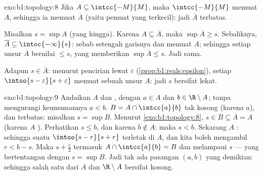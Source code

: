 \begin{solution}{exo:b1:topology:8}
Jika $A \subseteq \intcc{-M}{M}$, maka  $\intcc{-M}{M}$
memuat $A$, sehingga ia memuat $\overline A$ (yaitu pemuat 
yang terkecil): jadi $\overline A$ terbatas.

Misalkan $s = \sup A$ (yang hingga). Karena $A \subseteq \overline A$, maka $\sup
\overline A \geq s$. Sebaliknya, $\overline A \subseteq
\intoc{-\infty}{s}$: sebab setengah garisnya  dan memuat $A$; sehingga
setiap unsur $\overline A$ bernilai $\leq s$, yang memberikan $\sup\overline A
\leq s$. Jadi sama.

Adapun $s \in \overline A$: menurut pencirian lewat $\varepsilon$
(\cref{prop:b1:reals:epsilon}), setiap  $\intoo{s -
\varepsilon}{s + \varepsilon}$ memuat sebuah unsur $A$: jadi $s$
bersifat lekat.
\end{solution}

\begin{solution}{exo:b1:topology:9}
Andaikan $A$  dan , dengan $a \in A$ dan $b \in \R
\setminus A$; tanpa mengurangi keumumannya $a < b$.  $B = A \cap
\intcc{a}{b}$ tak kosong (karena $a$), dan terbatas: misalkan $s = \sup B$. Menurut
\cref{exo:b1:topology:8}, $s \in \overline B \subseteq \overline A =
A$ (karena $A$ ). Perhatikan $s \leq b$, dan karena $b \notin A$: maka $s < b$.
Sekarang $A$ : sehingga suatu  $\intoo{s - r}{s + r}$ terletak di $A$,
dan kita boleh mengambil $r < b - s$. Maka $s + \frac{r}{2}$ termasuk $A
\cap \intcc{a}{b} = B$ dan melampaui $s$ --- yang bertentangan dengan $s = \sup
B$. Jadi tak ada pasangan $(a, b)$ yang demikian: sehingga salah satu dari $A$ dan $\R \setminus A$
bersifat kosong.
\end{solution}


